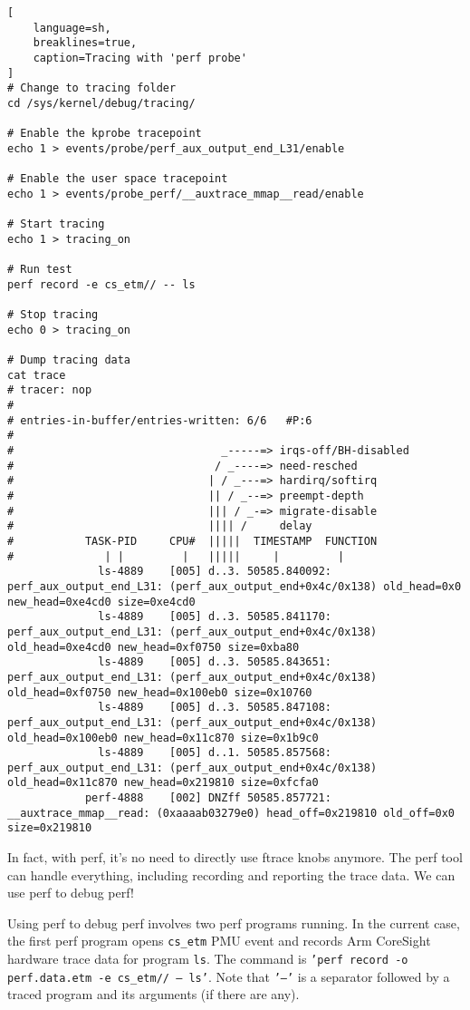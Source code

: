 \documentclass[11pt]{diazessay} %
\def\code#1{\texttt{#1}}
\begin{document}
\begin{lstlisting}[
  	language=sh,
	breaklines=true,
	caption=Tracing with 'perf probe'
]
# Change to tracing folder
cd /sys/kernel/debug/tracing/

# Enable the kprobe tracepoint
echo 1 > events/probe/perf_aux_output_end_L31/enable

# Enable the user space tracepoint
echo 1 > events/probe_perf/__auxtrace_mmap__read/enable

# Start tracing
echo 1 > tracing_on

# Run test
perf record -e cs_etm// -- ls

# Stop tracing
echo 0 > tracing_on

# Dump tracing data
cat trace
# tracer: nop
#
# entries-in-buffer/entries-written: 6/6   #P:6
#
#                                _-----=> irqs-off/BH-disabled
#                               / _----=> need-resched
#                              | / _---=> hardirq/softirq
#                              || / _--=> preempt-depth
#                              ||| / _-=> migrate-disable
#                              |||| /     delay
#           TASK-PID     CPU#  |||||  TIMESTAMP  FUNCTION
#              | |         |   |||||     |         |
              ls-4889    [005] d..3. 50585.840092: perf_aux_output_end_L31: (perf_aux_output_end+0x4c/0x138) old_head=0x0 new_head=0xe4cd0 size=0xe4cd0
              ls-4889    [005] d..3. 50585.841170: perf_aux_output_end_L31: (perf_aux_output_end+0x4c/0x138) old_head=0xe4cd0 new_head=0xf0750 size=0xba80
              ls-4889    [005] d..3. 50585.843651: perf_aux_output_end_L31: (perf_aux_output_end+0x4c/0x138) old_head=0xf0750 new_head=0x100eb0 size=0x10760
              ls-4889    [005] d..3. 50585.847108: perf_aux_output_end_L31: (perf_aux_output_end+0x4c/0x138) old_head=0x100eb0 new_head=0x11c870 size=0x1b9c0
              ls-4889    [005] d..1. 50585.857568: perf_aux_output_end_L31: (perf_aux_output_end+0x4c/0x138) old_head=0x11c870 new_head=0x219810 size=0xfcfa0
            perf-4888    [002] DNZff 50585.857721: __auxtrace_mmap__read: (0xaaaab03279e0) head_off=0x219810 old_off=0x0 size=0x219810
\end{lstlisting}

In fact, with perf, it's no need to directly use ftrace knobs anymore. The
perf tool can handle everything, including recording and reporting the trace
data. We can use perf to debug perf!

Using perf to debug perf involves two perf programs running. In the current
case, the first perf program opens \code{cs\_etm} PMU event and records
Arm CoreSight hardware trace data for program \code{ls}. The command is
\code{'perf record -o perf.data.etm -e cs\_etm// --- ls'}. Note that
\code{'---'} is a separator followed by a traced program and its arguments (if
there are any).
\end{document}
